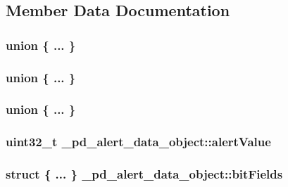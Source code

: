 \subsection{Member Data Documentation}
\hypertarget{struct__pd__alert__data__object_a7afcdf0544e42184994609713fb3cdbe}{\subsubsection[{"@1}]{\setlength{\rightskip}{0pt plus 5cm}union \{ ... \} }}\label{struct__pd__alert__data__object_a7afcdf0544e42184994609713fb3cdbe}
\hypertarget{struct__pd__alert__data__object_aabc4365931c292cf5604416fabb2d439}{\subsubsection[{"@13}]{\setlength{\rightskip}{0pt plus 5cm}union \{ ... \} }}\label{struct__pd__alert__data__object_aabc4365931c292cf5604416fabb2d439}
\hypertarget{struct__pd__alert__data__object_a4d3c08a0a6105e30c73fd2ab96f4890f}{\subsubsection[{"@7}]{\setlength{\rightskip}{0pt plus 5cm}union \{ ... \} }}\label{struct__pd__alert__data__object_a4d3c08a0a6105e30c73fd2ab96f4890f}
\hypertarget{struct__pd__alert__data__object_aed9a5657c490967d07dd7961217bc0f2}{
\subsubsection[{alert\-Value}]{\setlength{\rightskip}{0pt plus 5cm}uint32\-\_\-t \-\_\-pd\-\_\-alert\-\_\-data\-\_\-object\-::alert\-Value}}\label{struct__pd__alert__data__object_aed9a5657c490967d07dd7961217bc0f2}
\hypertarget{struct__pd__alert__data__object_a73b0e792258da5268f6fc612e1e7617b}{
\subsubsection[{bit\-Fields}]{\setlength{\rightskip}{0pt plus 5cm}struct \{ ... \}   \-\_\-pd\-\_\-alert\-\_\-data\-\_\-object\-::bit\-Fields}}\label{struct__pd__alert__data__object_a73b0e792258da5268f6fc612e1e7617b}
